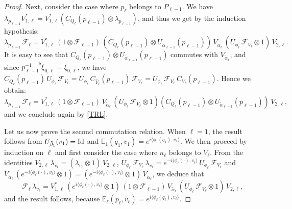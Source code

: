 \documentclass[a4paper,11pt,reqno]{amsart}
\numberwithin{equation}{section}
\theoremstyle{remark}
\theoremstyle{definition}
\newcommand{\F}{{\mathcal F}}
\newcommand{\E}{\mathbb E}
\begin{document}
\begin{proof}
Next, consider the case where  $p_\ell$ belongs to $P_{\ell-1}$.  We have
$\lambda_{p_{\ell-1}}V_{1,\ell}^*=V_{1,\ell}^*(C_{Q_\ell}(p_{\ell-1})\otimes \lambda_{p_{\ell-1}})$,
and thus we get by the induction hypothesis:
$$
\lambda_{p_{\ell-1}}\,\F_\ell=V_{1,\ell}^*\,(1\otimes \F_{\ell-1})\, (C_{Q_\ell}(p_{\ell-1})\otimes U_{\tilde\alpha_{\ell-1}}(p_{\ell-1}))\,
 V_{\tilde\alpha_\ell} \,( U_{\phi_\ell}\,\F_{V_\ell}\otimes 1)\,V_{2,\ell}.
$$
It is easy to see that  $ C_{Q_\ell} (p_{\ell-1})\otimes U_{\tilde\alpha_{\ell-1}}(p_{\ell-1})$ commutes with
$ V_{\tilde\alpha_\ell} $, and since ${p_{\ell-1}^{-1}}^\flat\xi_{0,\ell}=\xi_{0,\ell}$, we have
$ C_{Q_\ell} (p_{\ell-1})\, U_{\phi_\ell}\,\F_{V_\ell}= U_{\phi_\ell}\, C_{\hat V_\ell} (p_{\ell-1})\,\F_{V_\ell}= U_{\phi_\ell}\,\F_{V_\ell}\, C_{V_\ell}(p_{\ell-1})$. Hence we obtain:
 $$
\lambda_{p_{\ell-1}}\,\F_\ell=V_{1,\ell}^*\,(1\otimes \F_{\ell-1})\,
 V_{\tilde\alpha_\ell} \,( U_{\phi_\ell}\,\F_{V_\ell}\otimes 1)( C_{Q_\ell} (p_{\ell-1})\otimes U_{\tilde\alpha_{\ell-1}}(p_{\ell-1}))\,V_{2,\ell},
$$
and we conclude again by \eqref{TRL}.

\smallskip

 Let us now prove the second commutation relation. When $\ell=1$, the result follows  from
$U_{\tilde \beta_1}(v_1)={\rm Id}$ and $\E_1(q_1,v_1)=e^{i\langle\phi_1(q_1),v_1\rangle}$. We then proceed by induction on $\ell$ and first consider the case where
 $n_\ell$ belongs to $V_\ell$. From the identities $V_{2,\ell}\,\lambda_{v_\ell}=(\lambda_{v_\ell}\otimes 1)\,V_{2,\ell}$,
$ U_{\phi_\ell}\,\F_{V_\ell}\,\lambda_{v_\ell}= e^{-i\langle\phi_\ell(\cdot),v_\ell\rangle}\, U_{\phi_\ell}\,\F_{V_\ell}$
and $ V_{\tilde\alpha_\ell} \,(e^{-i\langle\phi_\ell(\cdot),v_\ell\rangle}\otimes 1)=(e^{-i\langle\phi_\ell(\cdot),v_\ell\rangle}\otimes 1)\,  V_{\tilde\alpha_\ell} $,
we deduce that
$$
\F_\ell\,\lambda_{v_\ell}=V_{1,\ell}^*\,(e^{i\langle\phi_\ell(\cdot),v_\ell\rangle}\otimes 1)\,(1\otimes \F_{\ell-1})\, V_{\tilde\alpha_\ell} \,( U_{\phi_\ell}\,\F_{V_\ell}\otimes 1)\,V_{2,\ell},
$$
and the result follows, because  $\E_\ell(p_\ell, v_\ell)=e^{i\langle\phi_\ell(q_\ell),v_\ell\rangle}$.


\end{proof}
\end{document}
